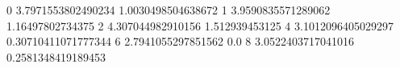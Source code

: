 0 3.7971553802490234 1.0030498504638672
1 3.9590835571289062 1.16497802734375
2 4.307044982910156 1.512939453125
4 3.1012096405029297 0.30710411071777344
6 2.7941055297851562 0.0
8 3.0522403717041016 0.2581348419189453
